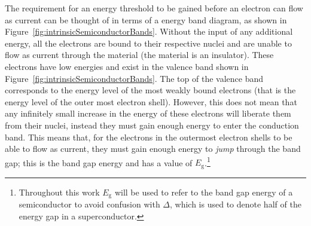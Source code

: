 \par 
The requirement for an energy threshold to be gained before an electron can flow as current can be thought of in terms of a energy band diagram, as shown in Figure~\ref{fig:intrinsicSemiconductorBands}. Without the input of any additional energy, all the electrons are bound to their respective nuclei and are unable to flow as current through the material (the material is an insulator). These electrons have low energies and exist in the valence band shown in Figure~\ref{fig:intrinsicSemiconductorBands}. The top of the valence band corresponds to the energy level of the most weakly bound electrons (that is the energy level of the outer most electron shell). However, this does not mean that any infinitely small increase in the energy of these electrons will liberate them from their nuclei, instead they must gain enough energy to enter the conduction band. This means that, for the electrons in the outermost electron shells to be able to flow as current, they must gain enough energy to \textit{jump} through the band gap; this is the band gap energy and has a value of $E_{\mathrm{g}}$.\footnote{Throughout this work $E_{\mathrm{g}}$ will be used to refer to the band gap energy of a semiconductor to avoid confusion with $\varDelta$, which is used to denote half of the energy gap in a superconductor.}

